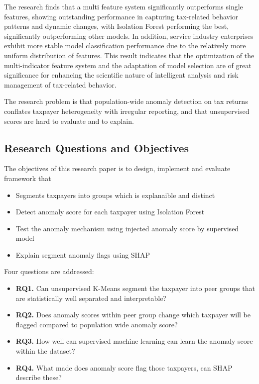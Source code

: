 The research finds that a multi feature system significantly outperforms single features, showing outstanding performance in capturing tax-related behavior patterns and dynamic changes, with Isolation Forest performing the best, significantly outperforming other models. In addition, service industry enterprises exhibit more stable model classification performance due to the relatively more uniform distribution of features. This result indicates that the optimization of the multi-indicator feature system and the adaptation of model selection are of great significance for enhancing the scientific nature of intelligent analysis and risk management of tax-related behavior.

The research problem is that population-wide anomaly detection on tax returns conflates taxpayer heterogeneity with irregular reporting, and that unsupervised scores are hard to evaluate and to explain.

\subsection{Research Questions and Objectives}

The objectives of this research paper is to design, implement and evaluate framework that

\begin{itemize}
    \item Segments taxpayers into groups which is explanaible and distinct
    \item Detect anomaly score for each taxpayer using Isolation Forest
    \item Test the anomaly mechanism using injected anomaly score by supervised model
    \item Explain segment anomaly flags using SHAP
\end{itemize}

Four questions are addressed:

\begin{itemize}
    \item \textbf{RQ1.} Can unsupervised K-Means segment the taxpayer into peer groups that are statistically well separated and interpretable?
    \item \textbf{RQ2.} Does anomaly scores within peer group change which taxpayer will be flagged compared to population wide anomaly score?
    \item \textbf{RQ3.} How well can supervised machine learning can learn the anomaly score within the dataset?
    \item \textbf{RQ4.} What made does anomaly score flag those taxpayers, can SHAP describe these?
\end{itemize}

